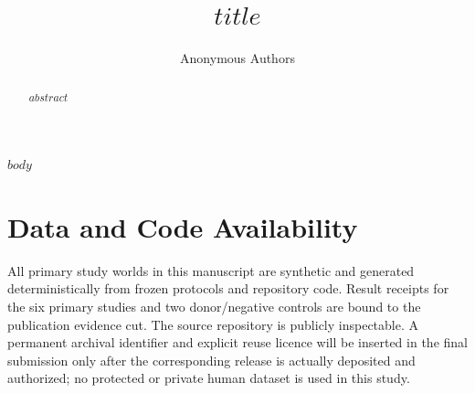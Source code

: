 \documentclass[10pt]{article}
\title{$title$}
\author{Anonymous Authors}
\date{}
\begin{document}
\maketitle

\begin{abstract}
$abstract$
\end{abstract}

$body$

\section*{Data and Code Availability}
All primary study worlds in this manuscript are synthetic and generated deterministically
from frozen protocols and repository code. Result receipts for the six primary studies and
two donor/negative controls are bound to the publication evidence cut. The source repository
is publicly inspectable. A permanent archival identifier and explicit reuse licence will be
inserted in the final submission only after the corresponding release is actually deposited
and authorized; no protected or private human dataset is used in this study.



\end{document}
